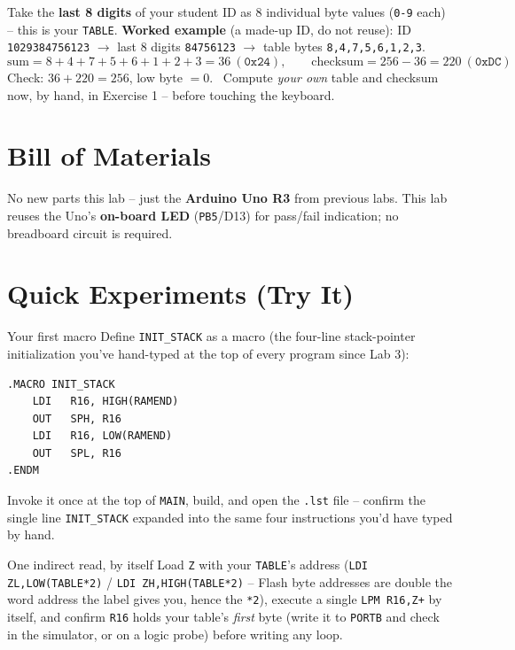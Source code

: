 \documentclass[11pt]{article}
\begin{document}
\begin{summary}
Take the \textbf{last 8 digits} of your student ID as 8 individual byte values
(\texttt{0-9} each) -- this is your \texttt{TABLE}.
\textbf{Worked example} (a made-up ID, do not reuse): ID \texttt{1029384756123}
$\to$ last 8 digits \texttt{84756123} $\to$ table bytes
\texttt{8,4,7,5,6,1,2,3}.
\[
\text{sum} = 8{+}4{+}7{+}5{+}6{+}1{+}2{+}3 = 36\ (\texttt{0x24}), \qquad
\text{checksum} = 256 - 36 = 220\ (\texttt{0xDC})
\]
Check: $36 + 220 = 256$, low byte $= 0$. \checkmark\ Compute \emph{your own} table
and checksum now, by hand, in Exercise 1 -- before touching the keyboard.
\end{summary}

\section*{Bill of Materials}
No new parts this lab -- just the \textbf{Arduino Uno R3} from previous labs. This
lab reuses the Uno's \textbf{on-board LED} (\texttt{PB5}/D13) for pass/fail
indication; no breadboard circuit is required.

\section*{Quick Experiments (Try It)}

\begin{tryit}{Your first macro}
Define \texttt{INIT\_STACK} as a macro (the four-line stack-pointer
initialization you've hand-typed at the top of every program since Lab 3):
\begin{lstlisting}
.MACRO INIT_STACK
    LDI   R16, HIGH(RAMEND)
    OUT   SPH, R16
    LDI   R16, LOW(RAMEND)
    OUT   SPL, R16
.ENDM
\end{lstlisting}
Invoke it once at the top of \texttt{MAIN}, build, and open the \texttt{.lst}
file -- confirm the single line \texttt{INIT\_STACK} expanded into the same four
instructions you'd have typed by hand.
\end{tryit}

\begin{tryit}{One indirect read, by itself}
Load \texttt{Z} with your \texttt{TABLE}'s address (\texttt{LDI ZL,LOW(TABLE*2)}
/ \texttt{LDI ZH,HIGH(TABLE*2)} -- Flash byte addresses are double the word
address the label gives you, hence the \texttt{*2}), execute a single
\texttt{LPM R16,Z+} by itself, and confirm \texttt{R16} holds your table's
\emph{first} byte (write it to \texttt{PORTB} and check in the simulator, or on a
logic probe) before writing any loop.
\end{tryit}
\end{document}

